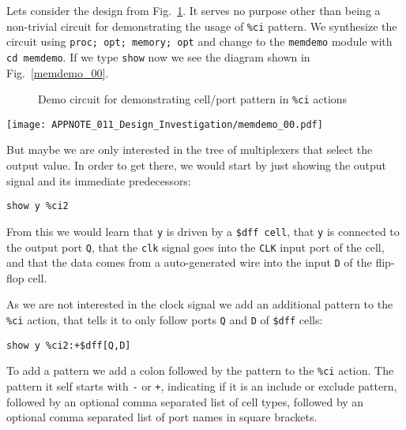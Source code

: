 \documentclass[9pt,technote,a4paper]{IEEEtran}
\begin{document}
Lets consider the design from Fig.~\ref{memdemo_src}. It serves no purpose other than being a non-trivial
circuit for demonstrating the usage of {\tt \%ci} pattern. We synthesize the circuit using {\tt proc;
opt; memory; opt} and change to the {\tt memdemo} module with {\tt cd memdemo}. If we type {\tt show}
now we see the diagram shown in Fig.~\ref{memdemo_00}.

\begin{figure}[b!]

\caption{Demo circuit for demonstrating cell/port pattern in {\tt \%ci} actions}
\label{memdemo_src}
\end{figure}

\begin{figure*}[t]
\texttt{[image: APPNOTE\_011\_Design\_Investigation/memdemo\_00.pdf]} \\
\caption{Complete circuit diagram for the design shown in Fig.~\ref{memdemo_src}}
\label{memdemo_00}
\end{figure*}

But maybe we are only interested in the tree of multiplexers that select the
output value. In order to get there, we would start by just showing the output signal
and its immediate predecessors:

\begin{verbatim}
show y %ci2
\end{verbatim}

From this we would learn that {\tt y} is driven by a {\tt \$dff cell}, that
{\tt y} is connected to the output port {\tt Q}, that the {\tt clk} signal goes
into the {\tt CLK} input port of the cell, and that the data comes from a
auto-generated wire into the input {\tt D} of the flip-flop cell.

As we are not interested in the clock signal we add an additional pattern to the {\tt \%ci}
action, that tells it to only follow ports {\tt Q} and {\tt D} of {\tt \$dff} cells:

\begin{verbatim}
show y %ci2:+$dff[Q,D]
\end{verbatim}

To add a pattern we add a colon followed by the pattern to the {\tt \%ci}
action. The pattern it self starts with {\tt -} or {\tt +}, indicating if it is
an include or exclude pattern, followed by an optional comma separated list
of cell types, followed by an optional comma separated list of port names in
square brackets.
\end{document}
